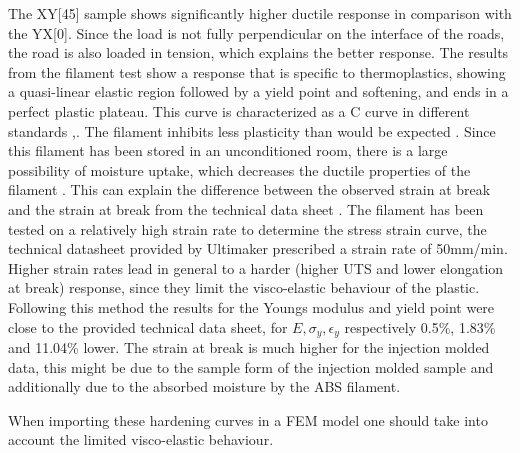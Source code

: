 The XY[45] sample shows significantly higher ductile response in comparison with the YX[0]. Since the load is not fully perpendicular on the interface of the roads, the road is also loaded in tension, which explains the better response.
The results from the filament test show a response that is specific to thermoplastics, showing a quasi-linear elastic region followed by a yield point and softening, and ends in a perfect plastic plateau. This curve is characterized as a C curve in different standards \cite{Afd2016NEN-EN-ISO527-2},\cite{Fahrenholz2018TheZwick/Roell}. The filament inhibits less plasticity than would be expected \cite{Rodriguez2001MechanicalInvestigation}. Since this filament has been stored in an unconditioned room, there is a large possibility of moisture uptake, which decreases the ductile properties of the filament \cite{Turner2014AModeling}. This can explain the difference between the observed strain at break and the strain at break from the technical data sheet \cite{Ultimaker2018TechnicalABS}. 
The filament has been tested on a relatively high strain rate to determine the stress strain curve, the technical datasheet provided by Ultimaker prescribed a strain rate of 50mm/min. Higher strain rates lead in general to a harder (higher UTS and lower elongation at break) response, since they limit the visco-elastic behaviour of the plastic. Following this method the results for the Youngs modulus and yield point were close to the provided technical data sheet, for $E, \sigma_y, \epsilon_y$ respectively 0.5\%, 1.83\% and 11.04\% lower. The strain at break is much higher for the injection molded data, this might be due to the sample form of the injection molded sample and additionally due to the absorbed moisture by the ABS filament.  

When importing these hardening curves in a FEM model one should take into account the limited visco-elastic behaviour. 

